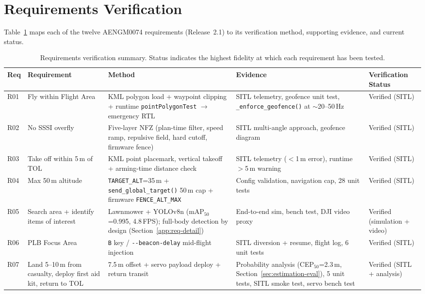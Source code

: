 \section{Requirements Verification}\label{sec:requirements}

Table~\ref{tab:req-verification} maps each of the twelve AENGM0074 requirements (Release~2.1) to its verification method, supporting evidence, and current status.

\begin{table}[htbp]
\centering
\caption{Requirements verification summary. Status indicates the highest fidelity at which each requirement has been tested.}
\label{tab:req-verification}
\scriptsize
\begin{tabular}{p{0.55cm}p{1.9cm}p{3.0cm}p{4.0cm}p{2.4cm}}
\toprule
\textbf{Req} & \textbf{Requirement} & \textbf{Method} & \textbf{Evidence} & \textbf{Verification Status} \\
\midrule
R01 & Fly within Flight Area & KML polygon load + waypoint clipping + runtime \texttt{pointPolygonTest} $\to$ emergency RTL & SITL telemetry, geofence unit test, \texttt{\_enforce\_geofence()} at ${\sim}$20--50\,Hz & Verified (SITL) \\
R02 & No SSSI overfly & Five-layer NFZ (plan-time filter, speed ramp, repulsive field, hard cutoff, firmware fence) & SITL multi-angle approach, geofence diagram & Verified (SITL) \\
R03 & Take off within 5\,m of TOL & KML point placemark, vertical takeoff + arming-time distance check & SITL telemetry ($<$1\,m error), runtime $>$5\,m warning & Verified (SITL) \\
R04 & Max 50\,m altitude & \texttt{TARGET\_ALT}=35\,m + \texttt{send\_global\_target()} 50\,m cap + firmware \texttt{FENCE\_ALT\_MAX} & Config validation, navigation cap, 28 unit tests & Verified (SITL) \\
R05 & Search area + identify items of interest & Lawnmower + YOLOv8n (mAP$_{50}$=0.995, 4.8\,FPS); full-body detection by design (Section~\ref{app:req-detail}) & End-to-end sim, bench test, DJI video proxy & Verified (simulation + video) \\
R06 & PLB Focus Area & \texttt{B} key / \texttt{-{}-beacon-delay} mid-flight injection & SITL diversion + resume, flight log, 6 unit tests & Verified (SITL) \\
R07 & Land 5--10\,m from casualty, deploy first aid kit, return to TOL & 7.5\,m offset + servo payload deploy + return transit & Probability analysis (CEP$_{50}$=2.3\,m, Section~\ref{sec:estimation-eval}), 5 unit tests, SITL smoke test, servo bench test & Verified (SITL + analysis) \\

\end{tabular}
\end{table}

